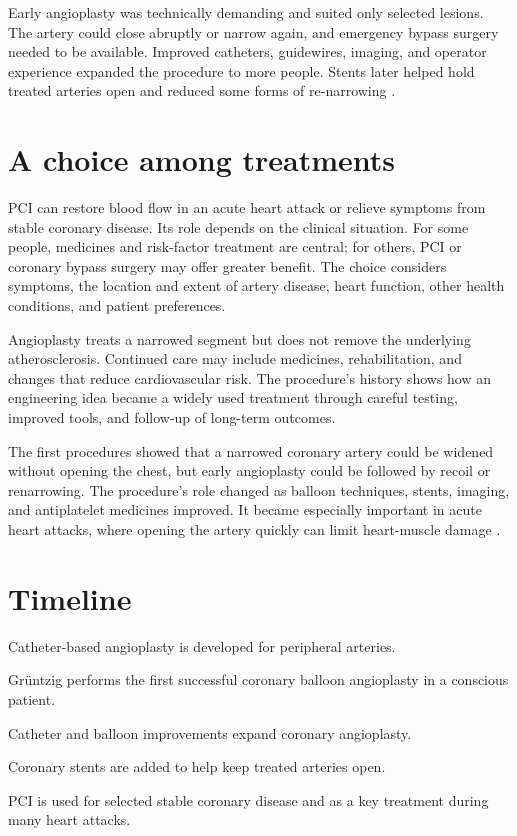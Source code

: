 \documentclass[12pt,oneside]{book}
\begin{document}
Early angioplasty was technically demanding and suited only selected
lesions. The artery could close abruptly or narrow again, and emergency
bypass surgery needed to be available. Improved catheters, guidewires,
imaging, and operator experience expanded the procedure to more people.
Stents later helped hold treated arteries open and reduced some forms of
re-narrowing \cite{angioplastyHistory}.

\section{A choice among treatments}
PCI can restore blood flow in an acute heart attack or relieve symptoms
from stable coronary disease. Its role depends on the clinical situation.
For some people, medicines and risk-factor treatment are central; for
others, PCI or coronary bypass surgery may offer greater benefit. The
choice considers symptoms, the location and extent of artery disease,
heart function, other health conditions, and patient preferences.

Angioplasty treats a narrowed segment but does not remove the underlying
atherosclerosis. Continued care may include medicines, rehabilitation,
and changes that reduce cardiovascular risk. The procedure's history
shows how an engineering idea became a widely used treatment through
careful testing, improved tools, and follow-up of long-term outcomes.

The first procedures showed that a narrowed coronary artery could be widened
without opening the chest, but early angioplasty could be followed by recoil
or renarrowing. The procedure’s role changed as balloon techniques, stents,
imaging, and antiplatelet medicines improved. It became especially important
in acute heart attacks, where opening the artery quickly can limit
heart-muscle damage \cite{gruentzigFirstPatient,angioplastyHistory}.

\section*{Timeline}
\begin{description}[leftmargin=2.3cm,style=nextline]
  \item[1960s--1970s] Catheter-based angioplasty is developed for peripheral arteries.
  \item[16 September 1977] Grüntzig performs the first successful coronary balloon angioplasty in a conscious patient.
  \item[1980s] Catheter and balloon improvements expand coronary angioplasty.
  \item[Late 1980s onward] Coronary stents are added to help keep treated arteries open.
  \item[Today] PCI is used for selected stable coronary disease and as a key treatment during many heart attacks.
\end{description}
\end{document}
